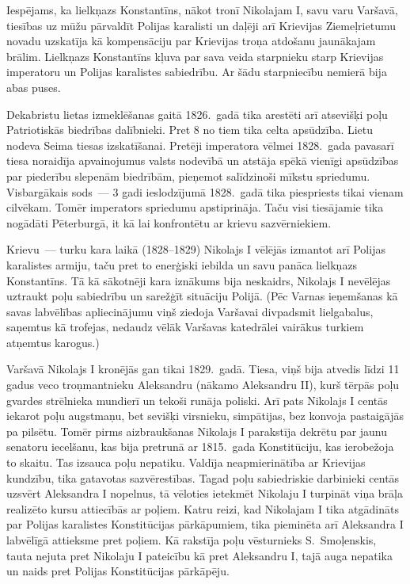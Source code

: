 \documentclass[twoside,a5paper,12pt,fleqn,openany]{extbook}
\begin{document}
Iespējams, ka lielkņazs Konstantīns, nākot tronī Nikolajam I, savu varu Varšavā, tiesības uz mūžu pārvaldīt Polijas karalisti un daļēji arī Krievijas Ziemeļrietumu novadu uzskatīja kā kompensāciju par Krievijas troņa atdošanu jaunākajam brālim. Lielkņazs Konstantīns kļuva par sava veida starpnieku starp Krievijas imperatoru un Polijas karalistes sabiedrību. Ar šādu starpniecību nemierā bija abas puses.

Dekabristu lietas izmeklēšanas gaitā 1826.~gadā tika arestēti arī atsevišķi poļu Patriotiskās biedrības dalībnieki. Pret 8 no tiem tika celta apsūdzība. Lietu nodeva Seima tiesas izskatīšanai. Pretēji imperatora vēlmei 1828.~gada pavasarī tiesa noraidīja apvainojumus valsts nodevībā un atstāja spēkā vienīgi apsūdzības par piederību slepenām biedrībām, pieņemot salīdzinoši mīkstu spriedumu. Visbargākais sods~--- 3 gadi ieslodzījumā 1828.~gadā tika piespriests tikai vienam cilvēkam. Tomēr imperators spriedumu apstiprināja. Taču visi tiesājamie tika nogādāti Pēterburgā, it kā lai konfrontētu ar krievu sazvērniekiem.

Krievu~--- turku kara laikā (1828--1829) Nikolajs I vēlējās izmantot arī Polijas karalistes armiju, taču pret to enerģiski iebilda un savu panāca lielkņazs Konstantīns. Tā kā sākotnēji kara iznākums bija neskaidrs, Nikolajs I nevēlējas uztraukt poļu sabiedrību un sarežģīt situāciju Polijā. (Pēc Varnas ieņemšanas kā savas labvēlības apliecinājumu viņš ziedoja Varšavai divpadsmit lielgabalus, saņemtus kā trofejas, nedaudz vēlāk Varšavas katedrālei vairākus turkiem atņemtus karogus.)

Varšavā Nikolajs I kronējās gan tikai 1829.~gadā. Tiesa, viņš bija atvedis līdzi 11 gadus veco troņmantnieku Aleksandru (nākamo Aleksandru II), kurš tērpās poļu gvardes strēlnieka mundierī un tekoši runāja poliski. Arī pats Nikolajs I centās iekarot poļu augstmaņu, bet sevišķi virsnieku, simpātijas, bez konvoja pastaigājās pa pilsētu. Tomēr pirms aizbraukšanas Nikolajs I parakstīja dekrētu par jaunu senatoru iecelšanu, kas bija pretrunā ar 1815.~gada Konstitūciju, kas ierobežoja to skaitu. Tas izsauca poļu nepatiku. Valdīja neapmierinātība ar Krievijas kundzību, tika gatavotas sazvērestības. Tagad poļu sabiedriskie darbinieki centās uzsvērt Aleksandra I nopelnus, tā vēloties ietekmēt Nikolaju I turpināt viņa brāļa realizēto kursu attiecībās ar poļiem. Katru reizi, kad Nikolajam I tika atgādināts par Polijas karalistes Konstitūcijas pārkāpumiem, tika pieminēta arī Aleksandra I labvēlīgā attieksme pret poļiem. Kā rakstīja poļu vēsturnieks S.~Smoļenskis, tauta nejuta pret Nikolaju I pateicību kā pret Aleksandru I, tajā auga nepatika un naids pret Polijas Konstitūcijas pārkāpēju.
\end{document}
